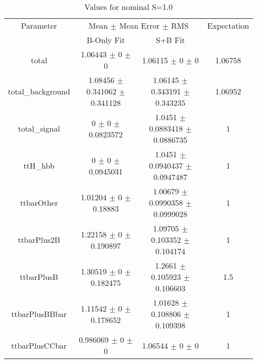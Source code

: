 \begin{table}
\centering
\caption{Values for nominal S=1.0}
\begin{tabular}{cccc}
\toprule
Parameter & \multicolumn{2}{c}{Mean $\pm$ Mean Error $\pm$ RMS} & Expectation\\
 & B-Only Fit & S+B Fit & \\
\midrule
total & \num{1.06443} $\pm$ \num{0} $\pm$ \num{0} & \num{1.06115} $\pm$ \num{0} $\pm$ \num{0} & \num{1.06758}\\
total\_background & \num{1.08456} $\pm$ \num{0.341062} $\pm$ \num{0.341128} & \num{1.06145} $\pm$ \num{0.343191} $\pm$ \num{0.343235} & \num{1.06952}\\
total\_signal & \num{0} $\pm$ \num{0} $\pm$ \num{0.0823572} & \num{1.0451} $\pm$ \num{0.0883418} $\pm$ \num{0.0886735} & \num{1}\\
ttH\_hbb & \num{0} $\pm$ \num{0} $\pm$ \num{0.0945031} & \num{1.0451} $\pm$ \num{0.0940437} $\pm$ \num{0.0947487} & \num{1}\\
ttbarOther & \num{1.01204} $\pm$ \num{0} $\pm$ \num{0.18883} & \num{1.00679} $\pm$ \num{0.0990358} $\pm$ \num{0.0999028} & \num{1}\\
ttbarPlus2B & \num{1.22158} $\pm$ \num{0} $\pm$ \num{0.190897} & \num{1.09705} $\pm$ \num{0.103352} $\pm$ \num{0.104174} & \num{1}\\
ttbarPlusB & \num{1.30519} $\pm$ \num{0} $\pm$ \num{0.182475} & \num{1.2661} $\pm$ \num{0.105923} $\pm$ \num{0.106603} & \num{1.5}\\
ttbarPlusBBbar & \num{1.11542} $\pm$ \num{0} $\pm$ \num{0.178652} & \num{1.01628} $\pm$ \num{0.108806} $\pm$ \num{0.109398} & \num{1}\\
ttbarPlusCCbar & \num{0.986069} $\pm$ \num{0} $\pm$ \num{0} & \num{1.06544} $\pm$ \num{0} $\pm$ \num{0} & \num{1}\\
\bottomrule
\end{tabular}
\end{table}